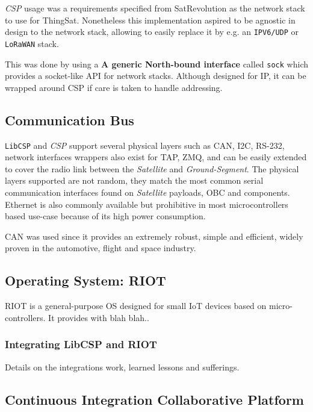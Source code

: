 \textit{CSP} usage was a requirements specified from SatRevolution as the network
stack to use for ThingSat. Nonetheless this implementation aspired to be agnostic
in design to the network stack, allowing to easily replace it by e.g. an
\texttt{IPV6/UDP} or \texttt{LoRaWAN} stack.

This was done by using a {\bf A generic North-bound interface} called \texttt{sock}
which provides a socket-like API for network stacks. Although designed for IP,
it can be wrapped around CSP if care is taken to handle addressing.

\subsection{Communication Bus}

\texttt{LibCSP} and \textit{CSP} support several physical layers such as CAN, I2C,
RS-232, network interfaces wrappers also exist for TAP, ZMQ, and can be easily
extended to cover the radio link between the \textit{Satellite} and
\textit{Ground-Segment}. The physical layers supported are not random, they match
the most common serial communication interfaces found on \textit{Satellite}
payloads, OBC and components. Ethernet is also commonly available  but prohibitive
in most microcontrollers based use-case because of its high power consumption.

CAN was used since it provides an extremely robust, simple and efficient,
widely proven in the automotive, flight and space industry.

\subsection{Operating System: RIOT}

RIOT is a general-purpose OS designed for small IoT devices based on micro-controllers.
It provides with blah blah..

\subsubsection{Integrating LibCSP and RIOT}

Details on the integrations work, learned lessons and sufferings.

\subsection{Continuous Integration \- Collaborative Platform}

